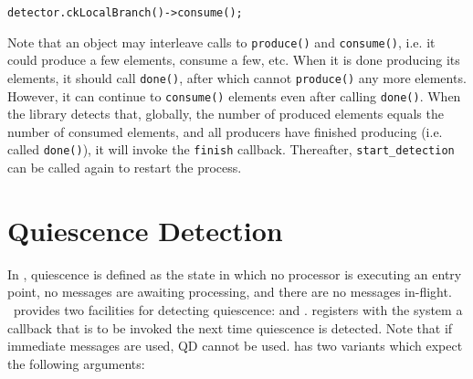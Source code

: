\begin{alltt}
detector.ckLocalBranch()->consume();
\end{alltt}

Note that an object may interleave calls to {\tt produce()} and {\tt consume()}, i.e.
it could produce a few elements, consume a few, etc. When it is done producing its elements,
it should call {\tt done()}, after which cannot {\tt produce()} any more elements. However,
it can continue to {\tt consume()} elements even after calling {\tt done()}. 
When the library detects that, globally, the number of produced elements equals
the number of consumed elements, and all producers have finished producing
(i.e. called {\tt done()}), it will invoke the \verb|finish| callback.
Thereafter, \verb|start_detection| can be called again to restart the process.

\section{Quiescence Detection}
\label{sec:qd}

In \charmpp, quiescence is defined as the state in which no
processor is executing an entry point, no messages are awaiting processing, and
there are no messages in-flight.  \charmpp\ provides two facilities for
detecting quiescence:  and .  
registers with the system a callback that is to be invoked the next time
quiescence is detected. Note that if immediate messages are
used, QD cannot be used.   has two variants
which expect the following arguments: 

